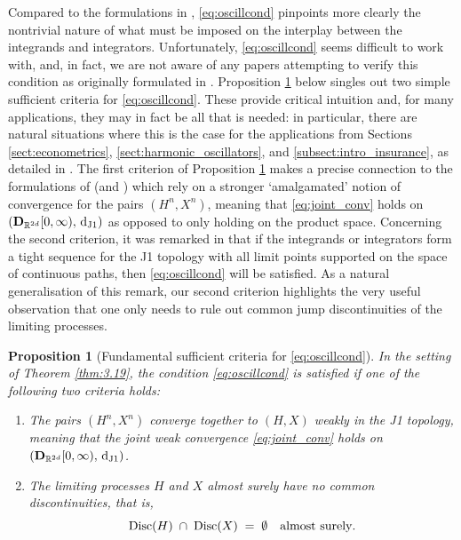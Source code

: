 \documentclass[11pt]{article}
\newtheorem{prop}[theorem]{Proposition}
\theoremstyle{definition}\newtheorem{example}[theorem]{Example}
\theoremstyle{definition}\newtheorem{counterexample}[theorem]{Counterexample}
\theoremstyle{definition}\newtheorem{remark}[theorem]{Remark}
\theoremstyle{definition}\newtheorem{defi}[theorem]{Definition}
\numberwithin{equation}{section}
\newcommand{\D}{{\bf D}}											%
\newcommand*\diff{\mathop{}\!\mathrm{d}}								%
\renewcommand{\|}{\; : \, \;}											%
\newcommand{\dJ}{\diff_{\operatorname{J1}}}								%
\begin{document}
Compared to the formulations in \cite{jakubowskimeminpages,kurtzprotter}, \eqref{eq:oscillcond} pinpoints more clearly the nontrivial nature of what must be imposed on the interplay between the integrands and integrators. Unfortunately, \eqref{eq:oscillcond} seems difficult to work with, and, in fact, we are not aware of any papers attempting to verify this condition as originally formulated in \cite{jakubowski}. Proposition \ref{prop:3.3} below singles out two simple sufficient criteria for \eqref{eq:oscillcond}. These provide critical intuition and, for many applications, they may in fact be all that is needed: in particular, there are natural situations where this is the case for the applications from Sections \ref{sect:econometrics}, \ref{sect:harmonic_oscillators}, and \ref{subsect:intro_insurance}, as detailed in \cite{andreasfabrice_applications}. The first criterion of Proposition \ref{prop:3.3} makes a precise connection
to the formulations of \cite{jakubowskimeminpages,kurtzprotter} (and \cite{shiryaev,graham}) which rely on a stronger `amalgamated' notion of convergence for the pairs $(H^n,X^n)$, meaning that \eqref{eq:joint_conv} holds on $(\D_{\mathbb{R}^{2d}}[0,\infty), \, \dJ)$ as opposed to only holding on the product space. Concerning the second criterion, it was remarked in \cite[Rmk.~4]{jakubowski} that if the integrands or integrators form a tight sequence for the J1 topology with all limit points supported on the space of continuous paths, then \eqref{eq:oscillcond} will be satisfied. As a natural generalisation of this remark, our second criterion highlights the very useful observation that one only needs to rule out common jump discontinuities of the limiting processes.




\begin{prop}[Fundamental sufficient criteria for \eqref{eq:oscillcond}]  \label{prop:3.3}
	In the setting of Theorem \ref{thm:3.19}, the condition \eqref{eq:oscillcond} is satisfied if one of the following two criteria holds:
	\begin{enumerate}
		\item The pairs $(H^n, X^n)$ converge together to $(H, X)$ weakly in the J1 topology, meaning that the joint weak convergence \eqref{eq:joint_conv} holds on $(\D_{\mathbb{R}^{2d}}[0,\infty), \, \dJ)$. \label{it:prop_suff_cond_AVCO}
		\item The limiting processes $H$ and $X$ almost surely have no common discontinuities, that is,
		\[
		\operatorname{Disc}(H) \; \cap \; \operatorname{Disc}(X) \; = \; \emptyset \quad \text{almost surely}. \vspace{-2pt}
		\]
	\end{enumerate}
\end{prop}
\end{document}
